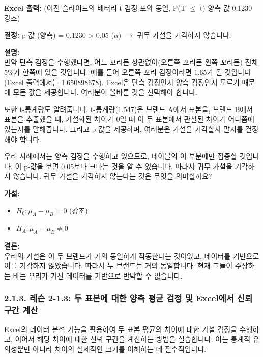 \documentclass[11pt,a4paper]{book}
\theoremstyle{definition}
\begin{document}
\begin{infobox}[title=Excel 워크시트 (8/9): p-값 기반 최종 결정]
\textbf{Excel 출력:} (이전 슬라이드의 배터리 t-검정 표와 동일, P(T $\le$ t) 양측 값 0.1230 강조)

\textbf{결정:}
p-값 (양측) = 0.1230 > 0.05 ($\alpha$) $\rightarrow$ 귀무 가설을 기각하지 않습니다.

\textbf{설명:} \\
만약 단측 검정을 수행했다면, 어느 꼬리든 상관없이(오른쪽 꼬리든 왼쪽 꼬리든) 전체 5\%가 한쪽에 있을 것입니다. 예를 들어 오른쪽 꼬리 검정이라면 1.65가 될 것입니다 (Excel 출력에서는 1.650898678). Excel은 단측 검정인지 양측 검정인지 모르기 때문에 모든 값을 제공합니다. 여러분이 올바른 것을 선택해야 합니다.

또한 t-통계량도 알려줍니다. t-통계량(1.547)은 브랜드 A에서 표본을, 브랜드 B에서 표본을 추출했을 때, 가설화된 차이가 0일 때 이 두 표본에서 관찰된 차이가 어디쯤에 있는지를 말해줍니다. 그리고 p-값을 제공하며, 여러분은 가설을 기각할지 말지를 결정해야 합니다.

우리 사례에서는 양측 검정을 수행하고 있으므로, 테이블의 이 부분에만 집중할 것입니다. 이 p-값을 보면 0.05보다 크다는 것을 알 수 있습니다. 따라서 귀무 가설을 기각하지 않습니다. 귀무 가설을 기각하지 않는다는 것은 무엇을 의미할까요?
\end{infobox}

\begin{infobox}[title=Excel 워크시트 (9/9): 최종 결론 도출]
\textbf{가설:}
\begin{itemize}
    \item $H_0 : \mu_A - \mu_B = 0$ (강조)
    \item $H_A : \mu_A - \mu_B \neq 0$
\end{itemize}
\textbf{결론:} \\
우리의 가설은 이 두 브랜드가 거의 동일하게 작동한다는 것이었고, 데이터를 기반으로 이를 기각하지 않았습니다. 따라서 두 브랜드는 거의 동일합니다. 현재 그들이 주장하는 바는 우리가 가진 데이터를 기반으로 반박할 수 없습니다.
\end{infobox}


\subsubsection*{2.1.3. 레슨 2-1.3: 두 표본에 대한 양측 평균 검정 및 Excel에서 신뢰 구간 계산}

\begin{summarybox}[title=핵심 요약: 가설 검정 후 신뢰 구간 계산]
Excel의 데이터 분석 기능을 활용하여 두 표본 평균의 차이에 대한 가설 검정을 수행하고, 이어서 해당 차이에 대한 신뢰 구간을 계산하는 방법을 실습합니다. 이는 통계적 유의성뿐만 아니라 차이의 실제적인 크기를 이해하는 데 필수적입니다.
\end{summarybox}
\end{document}
